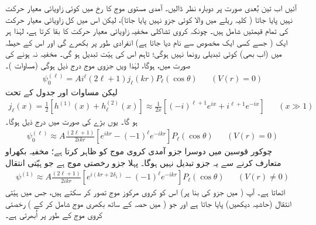 آئیں اب تین بُعدی صورت پر دوبارہ نظر ڈالیں۔ آمدی مستوی موج  کا  رخ میں کوئی زاویائی معیار حرکت نہیں پایا جاتا ( کلیہ ریلے میں  والا کوئی جزو نہیں پایا جاتا)، لیکن اس میں کل زاویائی معیار حرکت  کی تمام قیمتیں شامل ہیں۔ چونکہ کروی تشاکلی مخفیہ زاویائی معیار حرکت کا بقا کرتا ہے، لہٰذا ہر ایک  ( جسے کسی ایک مخصوص  سے نام دیا جاتا ہے) انفرادی طور پر بکھرے گی اور اس کے حیطہ میں (اب بھی) کوئی تبدیلی رونما نہیں ہوگی؛ تاہم اس کی ہیّت تبدیل ہو گی۔ مخفیہ نہ ہونے کی صورت میں،  ہوگا، لہٰذا ویں جزوی موج درج ذیل ہوگی (مساوات )۔
\begin{align}
	\psi_0^{(\ell)} = Ai^{\ell}(2\ell+1)j_{\ell}(kr)P_{\ell}(\cos\theta)&&(V(r)=0)
\end{align}
لیکن مساوات  اور جدول  کے تحت
\begin{align}
	j_{\ell}(x) = \frac{1}{2}\left[h^{(1)}(x)+h_{\ell}^{(2)}(x)\right]\approx\frac{1}{2x}\left[(-i)^{\ell+1}e^{ix}+i^{\ell+1}e^{-ix}\right]&&(x\gg1)
\end{align}
ہو گا۔ یوں بڑے  کی صورت میں درج ذیل ہوگا۔
\begin{align}
	\psi_0^{(\ell)}\approx A\frac{(2\ell+1)}{2ikr}\left[e^{ikr}-(-1)^{\ell}e^{-ikr}\right]P_{\ell}(\cos\theta)&&(V(r)=0)
\end{align}
چوکور قوسین میں دوسرا جزو آمدی کروی موج کو ظاہر کرتا ہے؛ مخفیہ بکھراو متعارف کرنے سے یہ جزو تبدیل نہیں ہوگا۔ پہلا جزو رخصتی موج ہے جو ہیّتی انتقال 
\begin{align}\label{مساوات_بکھراو_عمومی_روپ}
	\psi^{(1)}\approx A\frac{(2\ell+1)}{2ikr}\left[e^{i(kr+2\delta_1)}-(-1)^{\ell}e^{-ikr}\right]P_{\ell}(\cos\theta)&&(V(r)\neq0)
\end{align}
 اٹھاتا ہے۔ آپ ( میں  جزو کی بنا پر) اس کو کروی مرکوز موج تصور کر سکتے ہیں، جس میں  ہیّتی انتقال (حاشیہ  دیکھیں) پایا جاتا ہے اور جو (  میں  حصہ کے ساتھ بکھری موج شامل کر کے ) رخصتی کروی موج کے طور پر اُبھرتی ہے۔

